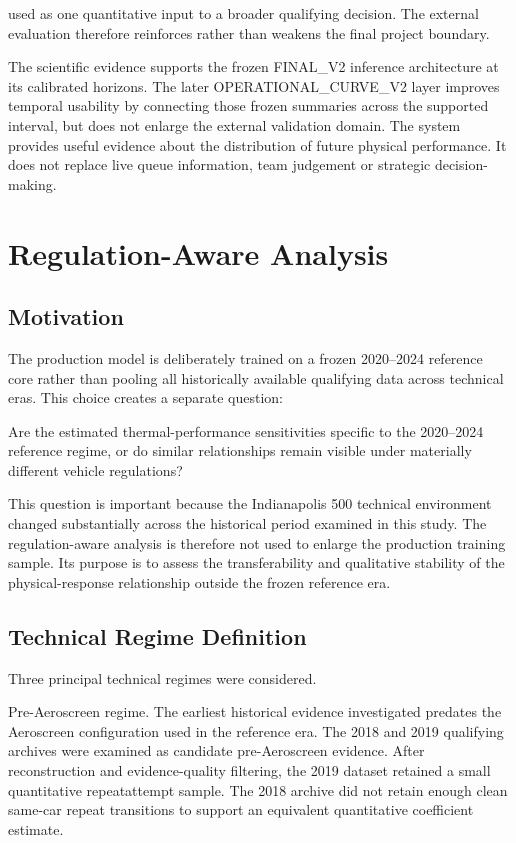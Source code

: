 used as one quantitative input to a broader qualifying decision. The external evaluation therefore reinforces rather than weakens the final project boundary.

The scientific evidence supports the frozen FINAL\_V2 inference architecture at its calibrated horizons. The later OPERATIONAL\_CURVE\_V2 layer improves temporal usability by connecting those frozen summaries across the supported interval, but does not enlarge the external validation domain. The system provides useful evidence about the distribution of future physical performance. It does not replace live queue information, team judgement or strategic decision-making.

\section{Regulation-Aware Analysis}

\subsection{Motivation}
The production model is deliberately trained on a frozen 2020--2024 reference core rather than pooling all historically available qualifying data across technical eras. This choice creates a separate question:

Are the estimated thermal-performance sensitivities specific to the 2020--2024 reference regime, or do similar relationships remain visible under materially different vehicle regulations?

This question is important because the Indianapolis 500 technical environment changed substantially across the historical period examined in this study. The regulation-aware analysis is therefore not used to enlarge the production training sample. Its purpose is to assess the transferability and qualitative stability of the physical-response relationship outside the frozen reference era.

\subsection{Technical Regime Definition}
Three principal technical regimes were considered.

Pre-Aeroscreen regime. The earliest historical evidence investigated predates the Aeroscreen configuration used in the reference era. The 2018 and 2019 qualifying archives were examined as candidate pre-Aeroscreen evidence. After reconstruction and evidence-quality filtering, the 2019 dataset retained a small quantitative repeatattempt sample. The 2018 archive did not retain enough clean same-car repeat transitions to support an equivalent quantitative coefficient estimate.

